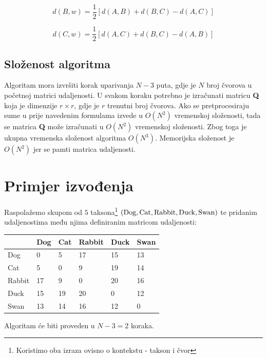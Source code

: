 \documentclass[times, utf8, seminar, numeric]{fer}
\begin{document}
\begin{equation}
d(B,w) = \frac{1}{2} \left [ d(A,B) + d(B,C) - d(A,C) \right ]
\end{equation}

\begin{equation}
d(C,w) = \frac{1}{2} \left [ d(A,C) + d(B,C) - d(A,B) \right ]
\end{equation}


\section{Složenost algoritma}

Algoritam mora izvršiti korak uparivanja $N-3$ puta, gdje je $N$ broj čvorova u početnoj matrici udaljenosti. U svakom koraku potrebno je izračunati matricu \textbf{Q} koja je dimenzije $r\times r$, gdje je $r$ trenutni broj čvorova. Ako se pretprocesiraju sume u prije navedenim formulama izvede u $O(N^2)$ vremenskoj složenosti, tada se matrica \textbf{Q} može izračunati u $O(N^2)$ vremenskoj složenosti. Zbog toga je ukupna vremenska složenost algoritma $O(N^3)$. Memorijska složenost je $O(N^2)$ jer se pamti matrica udaljenosti.

\chapter{Primjer izvođenja}

Raspolažemo skupom od $5$ taksona\footnote{Koristimo oba izraza ovisno o kontekstu - takson i čvor} $(\textup{Dog},\textup{Cat},\textup{Rabbit},\textup{Duck},\textup{Swan})$ te pridanim udaljenostima među njima definiranim matricom udaljenosti:
\begin{table}[h]
	\centering
    \begin{tabular}{|l|l|l|l|l|l|}
    \hline
    ~ & Dog  & Cat  & Rabbit  & Duck  & Swan  \\ \hline
    Dog & 0  & 5  & 17 & 15 & 13 \\ \hline
    Cat & 5  & 0  & 9  & 19 & 14 \\ \hline
    Rabbit & 17 & 9  & 0  & 20 & 16 \\ \hline
    Duck & 15 & 19 & 20 & 0  & 12 \\ \hline
    Swan & 13 & 14 & 16 & 12 & 0  \\ \hline
    \end{tabular}
\end{table}

Algoritam će biti proveden u $N-3=2$ koraka. \newline
\end{document}
